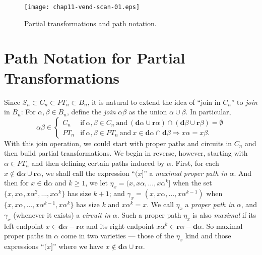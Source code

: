 \documentclass{surv-l}
\numberwithin{equation}{section}
\numberwithin{table}{section}
\numberwithin{figure}{section}
\theoremstyle{plain}
\theoremstyle{definition}
\begin{document}
\begin{figure}[!h]
\texttt{[image: chap11-vend-scan-01.eps]}
\caption{Partial transformations and path notation.}\label{fig11.50.1}
\end{figure}

\section{Path Notation for Partial Transformations}\label{sec11.51}

Since $S_{n}\subset C_{n}\subset PT_{n}\subset B_{n}$, it is
natural to extend the idea of ``join in $C_{n}$'' to \emph{join}
in $B_{n}$: For $\alpha,\beta\in B_{n}$, define the \emph{join}
$\alpha\beta$ as the union $\alpha\cup\beta$. In particular,
\[
\alpha\beta\in\begin{cases}
C_{n} & \mathrm{if}\ \alpha,\beta\in C_{n}\ \mathrm{and}\ (\mathbf{d}\alpha\cup \mathbf{r}\alpha)\cap(\mathbf{d}\beta\cup \mathbf{r}\beta)=\emptyset\\
PT_{n} & \mathrm{if}\ \alpha,\beta\in PT_{n}\ \mathrm{and}\ x\in \mathbf{d}\alpha\cap
\mathbf{d}\beta\Rightarrow x\alpha=x\beta.
\end{cases}
\]
With this join operation, we could start with proper paths and
circuits in $C_{n}$ and then build partial transformations. We
begin in reverse, however, starting with $\alpha\in
PT_{n}$ and then defining certain paths induced by $\alpha$.
First, for each $x\not\in \mathbf{d}\alpha\cup \mathbf{r}\alpha$,
we shall call the expression ``$(x]$'' a \emph{maximal proper path
in} $\alpha$. And then for $x\in
\mathbf{d}\alpha$ and $k\geq 1$, we let $\eta_{x}=(x,
x\alpha,\ldots, x\alpha^{k}]$ when the set $\{x,
x\alpha,x\alpha^{2},\ldots, x\alpha^{k}\}$ has size $k+1$; and
$\gamma_{x}=(x, x\alpha,\ldots, x\alpha^{k-1})$ when $\{x,
x\alpha,\ldots, x\alpha^{k-1}, x\alpha^{k}\}$ has size $k$ and
$x\alpha^{k}=x$. We call $\eta_{x}$ a \emph{proper path in}
$\alpha$, and $\gamma_{x}$ (whenever it exists) a \emph{circuit
in} $\alpha$. Such a proper path $\eta_{x}$ is also \emph{maximal}
if its left endpoint $ x\in \mathbf{d}\alpha-\mathbf{r}\alpha$ and
its right endpoint $ x\alpha^{k}\in
\mathbf{r}\alpha-\mathbf{d}\alpha$. So maximal proper paths in
$\alpha$ come in two varieties --- those of the $\eta_{x}$ kind
and those expressions ``$(x]$'' where we have $x\not\in
\mathbf{d}\alpha\cup \mathbf{r}\alpha$.
\end{document}
